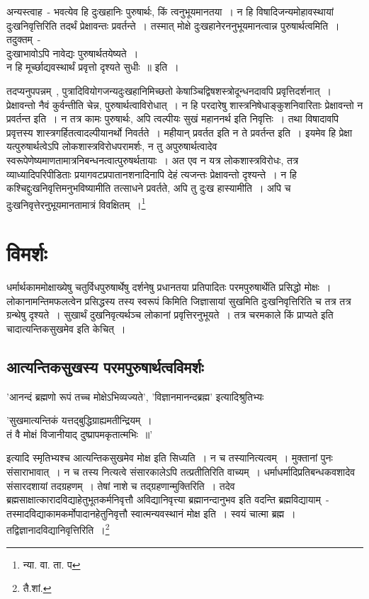 		{\fontsize{11.7}{0}\selectfont\s अन्यस्त्वाह~- भवत्येव हि दुःखहानिः पुरुषार्थः, किं त्वनुभूयमानतया~। न हि विषादिजन्यमोहावस्थायां दुःखनिवृत्तिरिति तदर्थं प्रेक्षावन्तः प्रवर्तन्ते~। तस्मात् मोक्षे दुःखहानेरननुभूयमानत्वान्न पुरुषार्थत्वमिति~। तदुक्तम्~-\\ दुःखाभावोऽपि नावेद्यः पुरुषार्थतयेष्यते~।\\ न हि मूर्च्छाद्यवस्थार्थं प्रवृत्तो दृश्यते सुधीः~॥ इति~।}

		{\fontsize{11.7}{0}\selectfont\s तदप्यनुपपन्नम्~, पुत्रादिवियोगजन्यदुःखहानिमिच्छतो केषाञ्चिद्विषशस्त्रोदून्धनदावपि प्रवृत्तिदर्शनात्~। प्रेक्षावन्तो नैवं कुर्वन्तीति चेन्न, पुरुषार्थत्वाविरोधात्~। न हि परदारेषु शास्त्रनिषेधाङ्कुशनिवारिताः प्रेक्षावन्तो न प्रवर्तन्त इति~। न तत्र कामः पुरुषार्थः, अपि त्वल्पीयः सुखं महाननर्थ इति निवृत्तिः~। तथा विषादावपि प्रवृत्तस्य शास्त्रगर्हितत्वादल्पीयानर्थो निवर्तते~। महीयान् प्रवर्तत इति न ते प्रवर्तन्त इति~। इयमेव हि प्रेक्षा यत्पुरुषार्थत्वेऽपि लोकशास्त्रविरोधपरामर्शः, न तु अपुरुषार्थत्वादेव स्वरूपेणेष्यमाणतामात्रनिबन्धनत्वात्पुरुषर्थतायाः~। अत एव न यत्र लोकशास्त्रविरोधः, तत्र व्याध्यादिपरिपीडिताः प्रयागवटप्रपातानशनादिनापि देहं त्यजन्तः प्रेक्षावन्तो दृश्यन्ते~। न हि कश्चिद्दुःखनिवृत्तिमनुभविष्यामीति तत्साधने प्रवर्तते, अपि तु दुःख हास्यामीति~। अपि च दुःखनिवृत्तेरनुभूयमानतामात्रं विवक्षितम्~।\footnote{न्या. वा. ता. प}}


	\section{विमर्शः}

	धर्मार्थकाममोक्षाख्येषु चतुर्विधपुरुषार्थेषु दर्शनेषु प्रधानतया प्रतिपादितः परमपुरुषार्थेति प्रसिद्धो मोक्षः~। लोकानामन्तिमफलत्वेन प्रसिद्धस्य तस्य स्वरूपं किमिति जिज्ञासायां सुखमिति दुःखनिवृत्तिरिति च तत्र तत्र ग्रन्थेषु दृश्यते~। सुखार्थं दुखनिवृत्यर्थञ्च लोकानां प्रवृत्तिरनुभूयते~। तत्र चरमकाले किं प्राप्यते इति चादात्यन्तिकसुखमेव इति केचित्~।

		\subsection{आत्यन्तिकसुखस्य परमपुरुषार्थत्वविमर्शः}

		'आनन्दं ब्रह्मणो रूपं तच्च मोक्षेऽभिव्यज्यते', 'विज्ञानमानन्दब्रह्म' इत्यादिश्रुतिभ्यः\\ \begin{center}'सुखमात्यन्तिकं यत्तद्बुद्धिग्राह्यमतीन्द्रियम्~।\\ तं वै मोक्षं विजानीयाद् दुष्प्रापमकृतात्मभिः~॥'\\\end{center} इत्यादि स्मृतिभ्यश्च आत्यन्तिकसुखमेव मोक्ष इति सिध्यति~। न च तस्यानित्यत्वम्~। मुक्तानां पुनः संसाराभावात्~। न च तस्य नित्यत्वे संसारकालेऽपि तत्प्रतीतिरिति वाच्यम्~। धर्माधर्मादिप्रतिबन्धकवशादेव संसारदशायां तदग्रहणम्~। तेषां नाशे च तद्ग्रहणान्मुक्तिरिति~। तदेव ब्रह्मसाक्षात्कारादविद्याहेतुभूतकर्मनिवृत्तौ अविद्यानिवृत्त्या ब्रह्मानन्दानुभव इति वदन्ति ब्रह्मविद्यायाम्~- {\fontsize{11.7}{0}\selectfont\s तस्मादविद्याकामकर्मोपादानहेतुनिवृत्तौ स्वात्मन्यवस्थानं मोक्ष इति~। स्वयं चात्मा ब्रह्म~। तद्विज्ञानादविद्यानिवृत्तिरिति~।\footnote{तै.शां.}}

